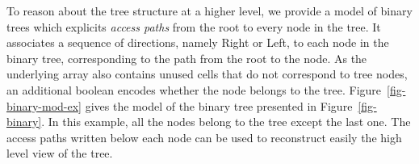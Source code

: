 \documentclass{llncs}
\begin{document}




To reason about the tree structure at a higher level, we provide a model of binary trees 
which explicits
\emph{access paths} from the root to every node in the tree.
It associates a sequence of
directions, namely Right or Left, to each node in the binary tree,
corresponding to the path from the root to the node. As the underlying array
also contains unused cells that do not correspond to tree nodes, an additional
boolean encodes whether the node belongs to the
tree. Figure~\ref{fig-binary-mod-ex} gives the model of the binary tree
presented in Figure~\ref{fig-binary}. In this example, all the nodes belong to
the tree except the last one. The access paths written below each node can be used to
reconstruct easily the high level view of the tree.

\end{document}
